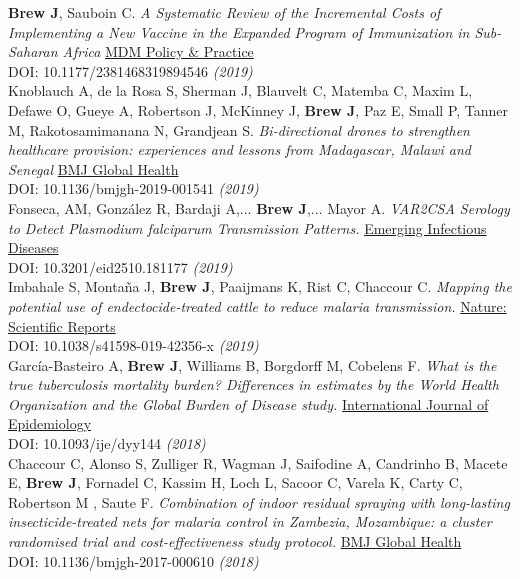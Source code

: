 \documentclass[11pt]{article}
\begin{document}
\noindent \textbf{Brew J}, Sauboin C. \emph{A Systematic Review of the Incremental Costs of Implementing a New Vaccine in the Expanded Program of Immunization in Sub-Saharan Africa} \href{https://doi.org/10.1177/2381468319894546}{MDM Policy & Practice} \\ DOI: 10.1177/2381468319894546 \hfill \emph{(2019)} \\

\noindent Knoblauch A, de la Rosa S, Sherman J, Blauvelt C, Matemba C, Maxim L, Defawe O, Gueye A, Robertson J, McKinney J, \textbf{Brew J}, Paz E, Small P, Tanner M, Rakotosamimanana N, Grandjean S. \emph{Bi-directional drones to strengthen healthcare provision: experiences and lessons from Madagascar, Malawi and Senegal} \href{https://dx.doi.org/10.1136/bmjgh-2019-001541}{BMJ Global Health} \\ DOI: 10.1136/bmjgh-2019-001541 \hfill \emph{(2019)} \\


\noindent Fonseca, AM, González R, Bardaji A,... \textbf{Brew J},... Mayor A. \emph{VAR2CSA Serology to Detect Plasmodium falciparum Transmission Patterns.} \href{https://wwwnc.cdc.gov/eid/article/25/10/18-1177_article}{Emerging Infectious Diseases} \\ DOI: 10.3201/eid2510.181177 \hfill \emph{(2019)} \\  


\noindent Imbahale S, Montaña J, \textbf{Brew J}, Paaijmans K, Rist C, Chaccour C. \emph{Mapping the potential use of endectocide-treated cattle to reduce malaria transmission.} \href{www.nature.com/articles/s41598-019-42356-x}{Nature: Scientific Reports} \\ DOI: 10.1038/s41598-019-42356-x \hfill \emph{(2019)} \\


\noindent García-Basteiro A, \textbf{Brew J}, Williams B, Borgdorff M, Cobelens F. \emph{What is the true tuberculosis mortality burden? Differences in estimates by the World Health Organization and the Global Burden of Disease study.} \href{https://academic.oup.com/ije/advance-article-abstract/doi/10.1093/ije/dyy144/5053290}{International Journal of Epidemiology} \\ DOI: 10.1093/ije/dyy144 \hfill \emph{(2018)} \\

\noindent Chaccour C, Alonso S, Zulliger R, Wagman J, Saifodine A, Candrinho B, Macete E, \textbf{Brew J}, Fornadel C, Kassim H, Loch L, Sacoor C, Varela K,  Carty C, Robertson  M , Saute F. \emph{Combination of indoor residual spraying with long-lasting insecticide-treated nets for malaria control in Zambezia, Mozambique: a cluster randomised trial and cost-effectiveness study protocol.} \href{http://gh.bmj.com/content/3/1/e000610}{BMJ Global Health} \\ DOI: 10.1136/bmjgh-2017-000610 \hfill \emph{(2018)} \\
\end{document}
